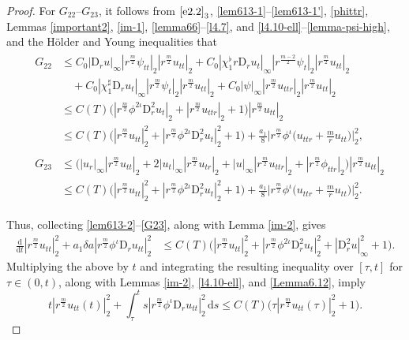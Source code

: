 \documentclass[11pt,reqno]{amsart}
\numberwithin{rk}{section}
\numberwithin{prop}{section}
\numberwithin{mydef}{section}
\numberwithin{lem}{section}
\numberwithin{equation}{section}
\numberwithin{thm}{section}
\begin{document}
\begin{proof}
For $G_{22}$--$G_{23}$, it follows from $\eqref{e2.2}_3$, \eqref{lem613-1}--\eqref{lem613-1'}, \eqref{phittr}, Lemmas \ref{important2}, \ref{im-1}, \ref{lemma66}--\ref{l4.7}, and \ref{l4.10-ell}--\ref{lemma-psi-high}, and the H\"older and Young inequalities that
\begin{align}
&\begin{aligned}
G_{22}
&\leq C_0|\mathrm{D}_r u|_\infty|r^\frac{m}{2}\psi_{tt}|_2|r^\frac{m}{2}u_{tt}|_2+C_0|\chi_1^\flat r\mathrm{D}_r u_t|_\infty |r^\frac{m-2}{2}\psi_t|_2|r^\frac{m}{2}u_{tt}|_2\\
&\quad +C_0|\chi_1^\sharp \mathrm{D}_r u_t|_\infty |r^\frac{m}{2}\psi_t|_2|r^\frac{m}{2}u_{tt}|_2+C_0|\psi|_\infty |r^\frac{m}{2}u_{ttr}|_2|r^\frac{m}{2}u_{tt}|_2\\
&\leq C(T) \big(|r^\frac{m}{2}\phi^{2\iota}\mathrm{D}_r^2 u_t|_2+|r^\frac{m}{2}u_{ttr}|_2+1\big)|r^\frac{m}{2}u_{tt}|_2\\
&\leq C(T)\big(|r^\frac{m}{2}u_{tt}|_2^2+|r^\frac{m}{2}\phi^{2\iota}\mathrm{D}_r^2 u_t|_2^2+1\big)+\frac{a_1}{8} \Big|r^\frac{m}{2}\phi^\iota\big(u_{ttr}+\frac{m}{r}u_{tt}\big)\Big|_2^2,
\end{aligned}\\
&\begin{aligned}
G_{23}&\leq \big(|u_r|_\infty |r^\frac{m}{2}u_{tt}|_2+2|u_t|_\infty |r^\frac{m}{2}u_{tr}|_2 + |u|_\infty |r^\frac{m}{2} u_{ttr}|_2 +|r^\frac{m}{2}\phi_{ttr}|_2\big)|r^\frac{m}{2}u_{tt}|_2\\
&\leq C(T)\big(|r^\frac{m}{2}u_{tt}|_2^2+|r^\frac{m}{2}\phi^{2\iota}\mathrm{D}_r^2 u_t|_2^2+1\big)+\frac{a_1}{8}\Big|r^\frac{m}{2}\phi^\iota\big(u_{ttr}+\frac{m}{r}u_{tt}\big)\Big|_2^2.
\end{aligned}\label{G23}
\end{align}






Thus, collecting \eqref{lem613-2}--\eqref{G23}, along with Lemma \ref{im-2}, gives
\begin{equation*} 
\begin{aligned}
\frac{\mathrm{d}}{\mathrm{d}t}|r^\frac{m}{2}u_{tt}|_2^2+a_1\delta a |r^\frac{m}{2}\phi^\iota\mathrm{D}_r u_{tt}|_2^2&\leq C(T)\big(|r^\frac{m}{2}u_{tt}|_2^2+|r^\frac{m}{2}\phi^{2\iota}\mathrm{D}_r^2 u_t|_2^2+|\mathrm{D}_r^2 u|_\infty^2+1\big).
\end{aligned}
\end{equation*}
Multiplying the above by $t$ and integrating the resulting inequality over $[\tau, t]$ for $\tau\in(0,t)$, along with Lemmas \ref{im-2}, \ref{l4.10-ell}, and \ref{Lemma6.12}, imply 
\begin{equation}\label{etrq2'}
t|r^{\frac{m}{2}}u_{tt}(t)|_2^2+ \int_\tau^t s |r^\frac{m}{2}\phi^\iota \mathrm{D}_r u_{tt}|_2^2\,\mathrm{d}s\leq C(T)\big(\tau|r^{\frac{m}{2}}u_{tt}(\tau)|_2^2+1\big).
\end{equation}
 


\end{proof}
\end{document}
